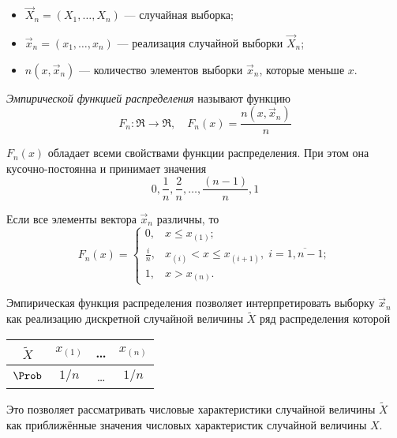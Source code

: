 \begin{itemize}
    \item $\vec{X}_n = (X_1, \ldots, X_n)$ --- случайная выборка;
    \item $\vec{x}_n = (x_1, \dots, x_n)$ --- реализация случайной выборки $\vec{X}_n$;
    \item $n(x, \vec{x}_n)$ --- количество элементов выборки $\vec{x}_n$, которые меньше $x$.
\end{itemize}

\begin{defn}
    \emph{Эмпирической функцией распределения} называют функцию
    \begin{equation}
        F_n\colon \Re \to \Re, \quad F_n(x) = \frac{n(x, \vec{x}_n)}{n}
    \end{equation}
\end{defn}
\begin{rem}
    $F_n(x)$ обладает всеми свойствами функции распределения. При этом она кусочно-постоянна и принимает значения 
    \[
        0, \frac{1}{n}, \frac{2}{n}, \ldots, \frac{(n-1)}{n}, 1
    \]
\end{rem}
\begin{rem}
    Если все элементы вектора $\vec{x}_n$ различны, то
    \begin{equation}
        F_n(x) = 
        \begin{cases}
            0, & x \leq x_{(1)}; \\
            \frac{i}{n}, & x_{(i)} < x \leq x_{(i+1)},\; i = \overline{1, n-1}; \\
            1, & x > x_{(n)}.
        \end{cases}
    \end{equation}
\end{rem}
\begin{rem}
    Эмпирическая функция распределения позволяет интерпретировать выборку $\vec{x}_n$ как реализацию дискретной случайной величины $\widetilde{X}$ ряд распределения которой
    \begin{center}
        \renewcommand{\arraystretch}{1.5}
        \begin{tabular}{| c || c | c | c |}
            \hline
            $\widetilde{X}$ & $x_{(1)}$ & \ldots & $x_{(n)}$ \\
            \hline
            $\Prob$ & $1/n$ & \ldots & $1/n$ \\
            \hline
        \end{tabular}
    \end{center}
    Это позволяет рассматривать числовые характеристики случайной величины $\widetilde{X}$ как приближённые значения числовых характеристик случайной величины $X$.
\end{rem}
